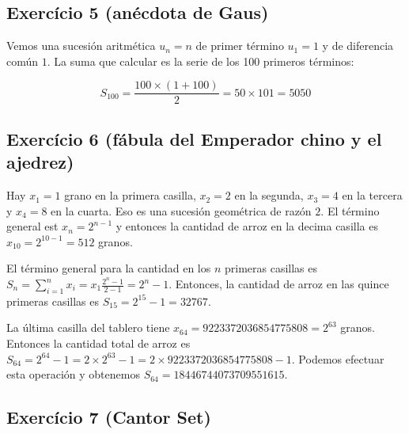 \subsection*{Exercício 5 (anécdota de Gaus)}

Vemos una sucesión aritmética $u_n = n$ de primer término $u_1 = 1$ y de
diferencia común $1$. La suma que calcular es la serie de los 100 primeros
términos:

$$
S_{100} = \frac{{100} \times {(1+100)}}{2} = 50 \times 101 = 5050
$$

\subsection*{Exercício 6 (fábula del Emperador chino y el ajedrez)}

Hay $x_1=1$ grano en la primera casilla, $x_2=2$ en la segunda, $x_3=4$ en la
tercera y $x_4=8$ en la cuarta. Eso es una sucesión geométrica de razón $2$.
El término general est $x_n = 2^{n-1}$ y entonces la
cantidad de arroz en la decima casilla es $x_{10} = 2^{10-1} = 512$ granos.

El término general para la cantidad en los $n$ primeras casillas es
$S_n = \sum_{i=1}^n x_i = x_1 \frac{2^n-1}{2-1} = 2^n - 1$. Entonces,
la cantidad de arroz en las quince primeras casillas es
$S_{15}  = 2^{15} - 1 = 32767$.

La última casilla del tablero tiene
$x_{64} = 9223372036854775808 = 2^{63}$ granos. Entonces la cantidad total de
arroz es $S_{64} = 2^{64} - 1 = 2 \times 2^{63} - 1 =
2 \times 9223372036854775808 - 1$. Podemos efectuar esta operación y obtenemos
$S_{64} = 18446744073709551615$.

\subsection*{Exercício 7 (Cantor Set)}

